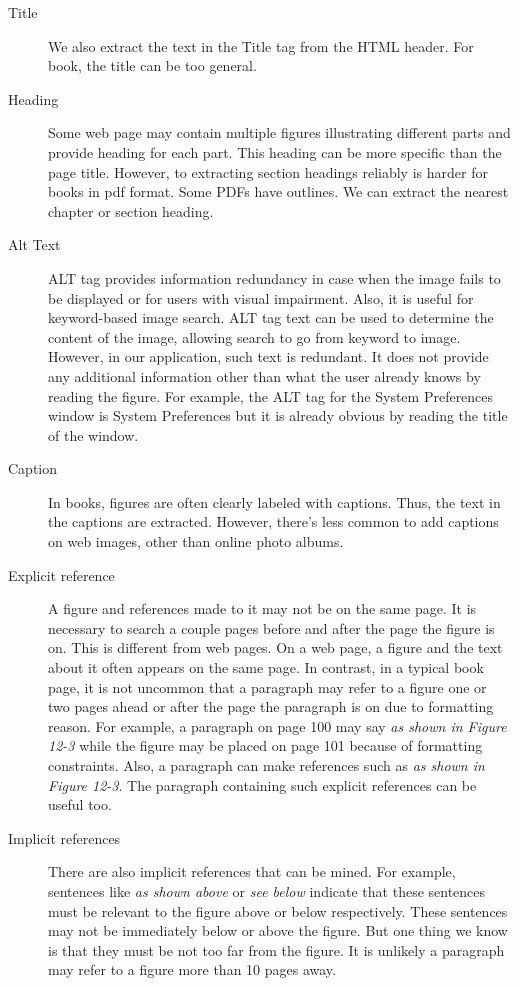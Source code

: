 \documentclass{www2010-submission}
\begin{document}
\begin{description}

\item[Title] We also extract the text in the Title tag from
the HTML header. For book, the title can be too general.

\item[Heading] Some web page may contain multiple figures
illustrating different parts and provide heading for each part.
This heading can be more specific than the page title. However, to
extracting section headings reliably is harder for books in pdf
format. Some PDFs have outlines. We can extract the nearest
chapter or section heading.

\item[Alt Text] ALT tag provides information redundancy in
case when the image fails to be displayed or for users with visual
impairment. Also, it is useful for keyword-based image search. ALT
tag text can be used to determine the content of the image,
allowing search to go from keyword to image. However, in our
application, such text is redundant. It does not provide any
additional information other than what the user already knows by
reading the figure. For example, the ALT tag for the System
Preferences window is System Preferences but it is already obvious
by reading the title of the window.

\item[Caption] In books, figures are often clearly labeled
with captions. Thus, the text in the captions are extracted.
However, there's less common to add captions on web images, other
than online photo albums.

\item[Explicit reference] A figure and references made to it
may not be on the same page. It is necessary to search a couple
pages before and after the page the figure is on. This is
different from web pages. On a web page, a figure and the text
about it often appears on the same page. In contrast, in a typical
book page, it is not uncommon that a paragraph may refer to a
figure one or two pages ahead or after the page the paragraph is
on due to formatting reason. For example, a paragraph on page 100
may say \emph{as shown in Figure 12-3} while the figure may be
placed on page 101 because of formatting constraints. Also, a
paragraph can make references such as \emph{as shown in Figure
12-3}. The paragraph containing such explicit references can be
useful too.


\item[Implicit references] There are also implicit references
that can be mined. For example, sentences like \emph{as shown
above} or \emph{see below} indicate that these sentences must be
relevant to the figure above or below respectively. These
sentences may not be immediately below or above the figure. But
one thing we know is that they must be not too far from the
figure. It is unlikely a paragraph may refer to a figure more than
10 pages away.


\end{description}
\end{document}
